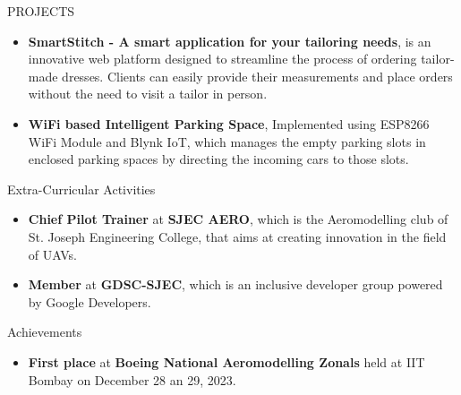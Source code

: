 \documentclass{resume} %
\begin{document}

\begin{rSection}{PROJECTS}
\begin{itemize}
\item \textbf{SmartStitch - A smart application for your tailoring needs}{, is an innovative web platform designed to streamline the process of ordering tailor-made dresses. Clients can easily provide their measurements and place orders without the need to visit a tailor in person.}
\item \textbf{WiFi based Intelligent Parking Space}{, Implemented using ESP8266 WiFi Module and Blynk IoT, which manages the empty parking slots in enclosed parking spaces by directing the incoming cars to those slots.}
\end{itemize}

\end{rSection} 

\begin{rSection}{Extra-Curricular Activities} 
    \begin{itemize}
        \item 	\textbf{Chief Pilot Trainer} at \textbf{SJEC AERO}, which is the Aeromodelling club of St. Joseph Engineering College, that aims at creating innovation in the field of UAVs.
        \item	\textbf{Member} at \textbf{GDSC-SJEC}, which is an inclusive developer group powered by Google Developers.
    
    \end{itemize}
    
    
    \end{rSection}

\begin{rSection}{Achievements} 
    \begin{itemize}
        \item 	\textbf{First place} at \textbf{Boeing National Aeromodelling Zonals} held at IIT Bombay on December 28 an 29, 2023.
    
    \end{itemize}
    
    
    \end{rSection}
\end{document}
